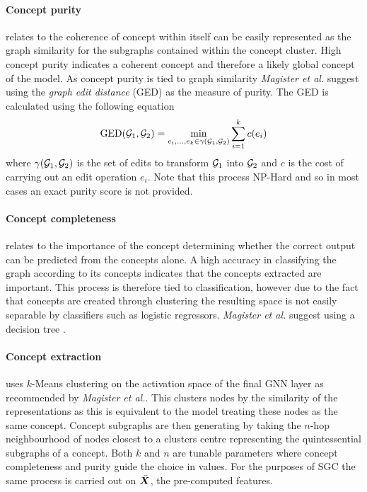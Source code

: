 \paragraph{Concept purity}
relates to the coherence of concept within itself can be easily represented as the graph similarity for the subgraphs contained within the concept cluster.
High concept purity indicates a coherent concept and therefore a likely global concept of the model.
As concept purity is tied to graph similarity \textit{Magister et al.}\cite{magister2021gcexplainer} suggest using the \emph{graph edit distance} (GED) as the measure of purity.
The GED is calculated using the following equation
\begin{equation}
    \label{eq:GED}
    \operatorname{GED}({\mathcal{G}}_1, {\mathcal{G}}_2) = \underset{e_i,...,e_k \in \gamma({\mathcal{G}}_1, {\mathcal{G}}_2)}{\operatorname{min}} \sum_{i=1}^{k}c(e_i)
\end{equation}
where $\gamma({\mathcal{G}}_1, {\mathcal{G}}_2)$ is the set of edits to transform ${\mathcal{G}}_1$ into ${\mathcal{G}}_2$ and $c$ is the cost of carrying out an edit operation $e_i$.
Note that this process NP-Hard and so in most cases an exact purity score is not provided.

\paragraph{Concept completeness}
relates to the importance of the concept determining whether the correct output can be predicted from the concepts alone.
A high accuracy in classifying the graph according to its concepts indicates that the concepts extracted are important.
This process is therefore tied to classification, however due to the fact that concepts are created through clustering the resulting space is not easily separable by classifiers such as logistic regressors.
\textit{Magister et al.}\cite{magister2021gcexplainer} suggest using a decision tree .



\paragraph{Concept extraction}
uses $k$-Means clustering on the activation space of the final GNN layer as recommended by \textit{Magister et al.}\cite{magister2021gcexplainer}.
This clusters nodes by the similarity of the representations as this is equivalent to the model treating these nodes as the same concept.
Concept subgraphs are then generating by taking the $n$-hop neighbourhood of nodes closest to a clusters centre representing the quintessential subgraphs of a concept.
Both $k$ and $n$ are tunable parameters where concept completeness and purity guide the choice in values.
For the purposes of SGC the same process is carried out on $\bar{{\bm{X}}}$, the pre-computed features.

